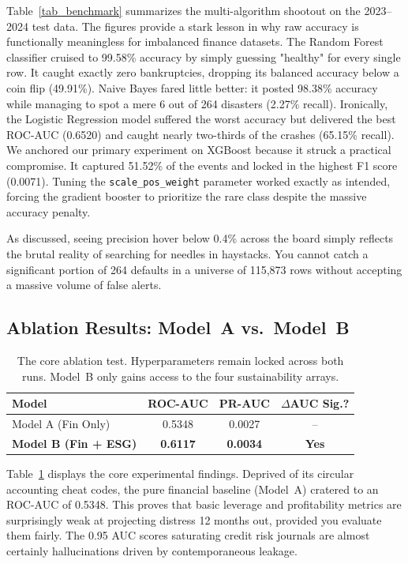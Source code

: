 \documentclass[sigconf,anonymous]{acmart}
\begin{document}
Table~\ref{tab_benchmark} summarizes the multi-algorithm shootout on the 2023--2024 test data. The figures provide a stark lesson in why raw accuracy is functionally meaningless for imbalanced finance datasets. The Random Forest classifier cruised to 99.58\% accuracy by simply guessing "healthy" for every single row. It caught exactly zero bankruptcies, dropping its balanced accuracy below a coin flip (49.91\%). Naive Bayes fared little better: it posted 98.38\% accuracy while managing to spot a mere 6 out of 264 disasters (2.27\% recall). Ironically, the Logistic Regression model suffered the worst accuracy but delivered the best ROC-AUC (0.6520) and caught nearly two-thirds of the crashes (65.15\% recall). We anchored our primary experiment on XGBoost because it struck a practical compromise. It captured 51.52\% of the events and locked in the highest F1 score (0.0071). Tuning the \texttt{scale\_pos\_weight} parameter worked exactly as intended, forcing the gradient booster to prioritize the rare class despite the massive accuracy penalty.

As discussed, seeing precision hover below 0.4\% across the board simply reflects the brutal reality of searching for needles in haystacks. You cannot catch a significant portion of 264 defaults in a universe of 115,873 rows without accepting a massive volume of false alerts.

\subsection{Ablation Results: Model~A vs.\ Model~B}

\begin{table}[htbp]
\caption{The core ablation test. Hyperparameters remain locked across both runs. Model~B only gains access to the four sustainability arrays.}
\begin{center}
\begin{tabular}{lccc}
\toprule
\textbf{Model} & \textbf{ROC-AUC} & \textbf{PR-AUC} & \textbf{$\Delta$AUC Sig.?} \\
\midrule
Model A (Fin Only) & 0.5348 & 0.0027 & -- \\
\textbf{Model B (Fin + ESG)} & \textbf{0.6117} & \textbf{0.0034} & \textbf{Yes} \\
\bottomrule
\end{tabular}
\label{tab_ablation}
\end{center}
\end{table}

Table~\ref{tab_ablation} displays the core experimental findings. Deprived of its circular accounting cheat codes, the pure financial baseline (Model~A) cratered to an ROC-AUC of 0.5348. This proves that basic leverage and profitability metrics are surprisingly weak at projecting distress 12 months out, provided you evaluate them fairly. The 0.95 AUC scores saturating credit risk journals are almost certainly hallucinations driven by contemporaneous leakage.
\end{document}
